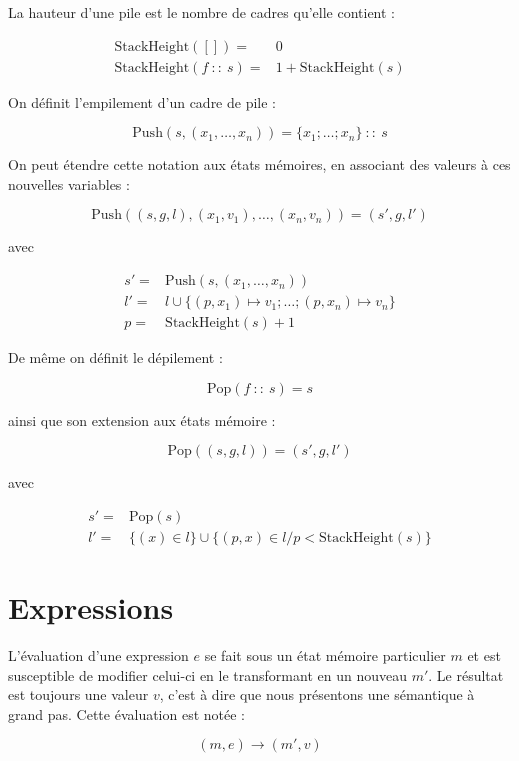 \begin{definition}

  La hauteur d'une pile est le nombre de cadres qu'elle contient :

  \begin{align*}
    \mathrm{StackHeight}([])     = & 0 \\
    \mathrm{StackHeight}(f~::~s) = & 1 + \mathrm{StackHeight}(s)
  \end{align*}

  On définit l'empilement d'un cadre de pile :

  \[
    \mathrm{Push}(s, (x_1, …, x_n)) = \{ x_1 ; … ; x_n \}~::~s
  \]

  On peut étendre cette notation aux états mémoires, en associant des valeurs à
  ces nouvelles variables :

  \[
    \mathrm{Push}((s, g, l), (x_1, v_1), …, (x_n, v_n)) = (s', g, l')
  \]

  avec

  \begin{align*}
    s' = & \mathrm{Push}(s, (x_1, …, x_n)) \\
    l' = & l \cup \{(p, x_1) ↦ v_1; … ; (p, x_n) ↦ v_n\} \\
    p  = & \mathrm{StackHeight}(s) + 1
  \end{align*}

  De même on définit le dépilement :

  \[
    \mathrm{Pop}(f~::~s) = s
  \]

  ainsi que son extension aux états mémoire :

  \[
    \mathrm{Pop}((s, g, l)) = (s', g, l')
  \]

  avec

  \begin{align*}
    s' = & \mathrm{Pop}(s) \\
    l' = & \{ (x) ∈ l \} \cup \{ (p, x) ∈ l / p < \mathrm{StackHeight}(s) \}
  \end{align*}

\end{definition}

\section{Expressions}

\begin{definition}

  L'évaluation d'une expression $e$ se fait sous un état mémoire particulier $m$ et est
  susceptible de modifier celui-ci en le transformant en un nouveau $m'$. Le
  résultat est toujours une valeur $v$, c'est à dire que nous présentons une
  sémantique à grand pas. Cette évaluation est notée :

  \[
    (m, e) → (m', v)
  \]

\end{definition}

